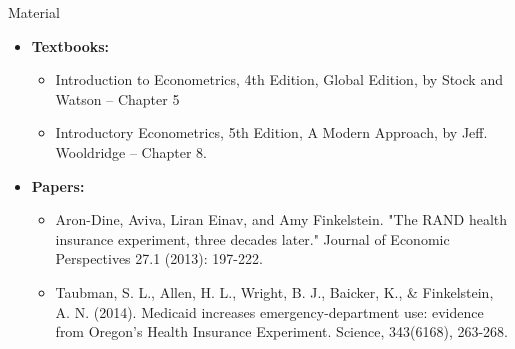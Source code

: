 \documentclass[notes,10pt, aspectratio=169]{beamer}
\begin{document}
\begin{frame}[allowframebreaks]{Material}
\begin{itemize}
    \item[--] \textbf{Textbooks:}
    \begin{itemize}
        \item Introduction to Econometrics, 4th Edition, Global Edition, by Stock and Watson -- Chapter 5
        \item Introductory Econometrics, 5th Edition, A Modern Approach, by Jeff. Wooldridge  -- Chapter 8.
    \end{itemize}
    \item[--] \textbf{Papers:}
    \begin{itemize}
        \item Aron-Dine, Aviva, Liran Einav, and Amy Finkelstein. "The RAND health insurance experiment, three decades later." Journal of Economic Perspectives 27.1 (2013): 197-222.
        \item Taubman, S. L., Allen, H. L., Wright, B. J., Baicker, K., \& Finkelstein, A. N. (2014). Medicaid increases emergency-department use: evidence from Oregon's Health Insurance Experiment. Science, 343(6168), 263-268.
    \end{itemize}
\end{itemize}
\scriptsize{

 
}
\end{frame}
\end{document}
